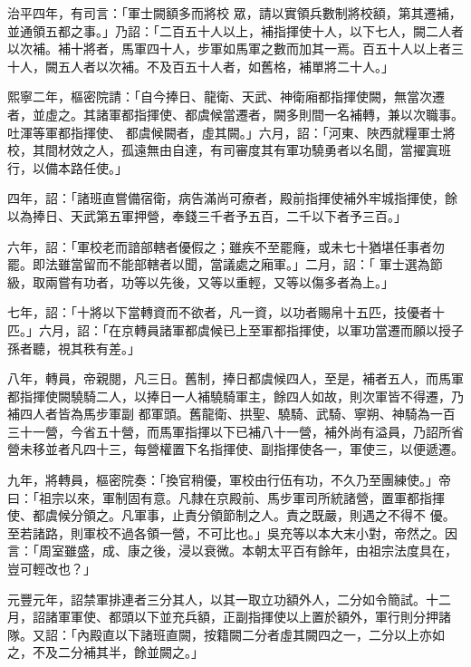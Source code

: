 \begin{pinyinscope}
 治平四年，有司言：「軍士闕額多而將校
 眾，請以實領兵數制將校額，第其遷補，並通領五都之事。」乃詔：「二百五十人以上，補指揮使十人，以下七人，闕二人者以次補。補十將者，馬軍四十人，步軍如馬軍之數而加其一焉。百五十人以上者三十人，闕五人者以次補。不及百五十人者，如舊格，補單將二十人。」



 熙寧二年，樞密院請：「自今捧日、龍衛、天武、神衛廂都指揮使闕，無當次遷者，並虛之。其諸軍都指揮使、都虞候當遷者，闕多則間一名補轉，兼以次職事。吐渾等軍都指揮使、
 都虞候闕者，虛其闕。」六月，詔：「河東、陜西就糧軍士將校，其間材效之人，孤遠無由自達，有司審度其有軍功驍勇者以名聞，當擢寘班行，以備本路任使。」



 四年，詔：「諸班直嘗備宿衛，病告滿尚可療者，殿前指揮使補外牢城指揮使，餘以為捧日、天武第五軍押營，奉錢三千者予五百，二千以下者予三百。」



 六年，詔：「軍校老而諳部轄者優假之；雖疾不至罷癃，或未七十猶堪任事者勿罷。即法雖當留而不能部轄者以聞，當議處之廂軍。」二月，詔：「
 軍士選為節級，取兩嘗有功者，功等以先後，又等以重輕，又等以傷多者為上。」



 七年，詔：「十將以下當轉資而不欲者，凡一資，以功者賜帛十五匹，技優者十匹。」六月，詔：「在京轉員諸軍都虞候已上至軍都指揮使，以軍功當遷而願以授子孫者聽，視其秩有差。」



 八年，轉員，帝親閱，凡三日。舊制，捧日都虞候四人，至是，補者五人，而馬軍都指揮使闕驍騎二人，以捧日一人補驍騎軍主，餘四人如故，則次軍皆不得遷，乃補四人者皆為馬步軍副
 都軍頭。舊龍衛、拱聖、驍騎、武騎、寧朔、神騎為一百三十一營，今省五十營，而馬軍指揮以下已補八十一營，補外尚有溢員，乃詔所省營未移並者凡四十三，每營權置下名指揮使、副指揮使各一，軍使三，以便遞遷。



 九年，將轉員，樞密院奏：「換官稍優，軍校由行伍有功，不久乃至團練使。」帝曰：「祖宗以來，軍制固有意。凡隸在京殿前、馬步軍司所統諸營，置軍都指揮使、都虞候分領之。凡軍事，止責分領節制之人。責之既嚴，則遇之不得不
 優。至若諸路，則軍校不過各領一營，不可比也。」吳充等以本大末小對，帝然之。因言：「周室雖盛，成、康之後，浸以衰微。本朝太平百有餘年，由祖宗法度具在，豈可輕改也？」



 元豐元年，詔禁軍排連者三分其人，以其一取立功額外人，二分如令簡試。十二月，詔諸軍軍使、都頭以下並充兵額，正副指揮使以上置於額外，軍行則分押諸隊。又詔：「內殿直以下諸班直闕，按籍闕二分者虛其闕四之一，二分以上亦如之，不及二分補其半，餘並闕之。」




\end{pinyinscope}
